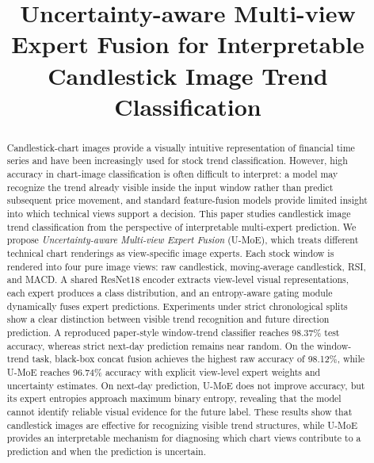 ﻿\documentclass[conference]{IEEEtran}
\newcommand{\method}{U-MoE}
\begin{document}
\title{Uncertainty-aware Multi-view Expert Fusion for Interpretable Candlestick Image Trend Classification}

\author{
}

\maketitle

\begin{abstract}
Candlestick-chart images provide a visually intuitive representation of financial time series and have been increasingly used for stock trend classification. However, high accuracy in chart-image classification is often difficult to interpret: a model may recognize the trend already visible inside the input window rather than predict subsequent price movement, and standard feature-fusion models provide limited insight into which technical views support a decision. This paper studies candlestick image trend classification from the perspective of interpretable multi-expert prediction. We propose \emph{Uncertainty-aware Multi-view Expert Fusion} (\method), which treats different technical chart renderings as view-specific image experts. Each stock window is rendered into four pure image views: raw candlestick, moving-average candlestick, RSI, and MACD. A shared ResNet18 encoder extracts view-level visual representations, each expert produces a class distribution, and an entropy-aware gating module dynamically fuses expert predictions. Experiments under strict chronological splits show a clear distinction between visible trend recognition and future direction prediction. A reproduced paper-style window-trend classifier reaches 98.37\% test accuracy, whereas strict next-day prediction remains near random. On the window-trend task, black-box concat fusion achieves the highest raw accuracy of 98.12\%, while \method{} reaches 96.74\% accuracy with explicit view-level expert weights and uncertainty estimates. On next-day prediction, \method{} does not improve accuracy, but its expert entropies approach maximum binary entropy, revealing that the model cannot identify reliable visual evidence for the future label. These results show that candlestick images are effective for recognizing visible trend structures, while \method{} provides an interpretable mechanism for diagnosing which chart views contribute to a prediction and when the prediction is uncertain.
\end{abstract}
\end{document}
